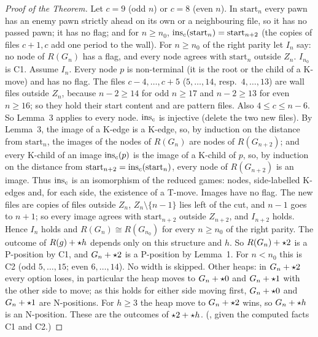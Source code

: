 \begin{wallproof}
\begin{proof}[Proof of the Theorem]
Let $c=9$ (odd $n$) or $c=8$ (even $n$). In $\mathrm{start}_n$ every pawn has an enemy pawn strictly ahead on its own or a neighbouring
file, so it has no passed pawn; it has no flag; and for $n\ge n_0$, $\operatorname{ins}_c(\mathrm{start}_n)=\mathrm{start}_{n+2}$ (the copies of files
$c+1,c$ add one period to the wall). For $n\ge n_0$ of the right parity let $I_n$ say: no node of $R(G_n)$ has a flag, and every node agrees with
$\mathrm{start}_n$ outside $Z_n$. $I_{n_0}$ is C1.
Assume $I_n$. Every node $p$ is non-terminal (it is the root or the child of a K-move) and has no flag. The files $c-4,\dots,c+5$
($5,\dots,14$, resp.\ $4,\dots,13$) are wall files outside $Z_n$, because $n-2\ge14$ for odd $n\ge17$ and $n-2\ge13$ for even
$n\ge16$; so they hold their start content and are pattern files. Also $4\le c\le n-6$. So Lemma~3 applies to every node.
$\operatorname{ins}_c$ is injective (delete the two new files). By Lemma~3, the image of a K-edge is a K-edge, so, by induction on the distance from
$\mathrm{start}_n$, the images of the nodes of $R(G_n)$ are nodes of $R(G_{n+2})$; and every K-child of an image $\operatorname{ins}_c(p)$ is the image of a K-child of $p$, so, by induction on the distance
from $\mathrm{start}_{n+2}=\operatorname{ins}_c(\mathrm{start}_n)$, every node of $R(G_{n+2})$ is an image. Thus $\operatorname{ins}_c$ is an isomorphism of the
reduced games: nodes, side-labelled K-edges and, for each side, the existence of a T-move. Images have no flag. The new files are copies of files outside $Z_n$, $Z_n\setminus\{n-1\}$ lies left of the cut, and $n-1$ goes to
$n+1$; so every image agrees with $\mathrm{start}_{n+2}$ outside $Z_{n+2}$, and $I_{n+2}$ holds.
Hence $I_n$ holds and $R(G_n)\cong R(G_{n_0})$ for every $n\ge n_0$ of the right parity. The outcome of $R(g)+\mathord{\star h}$ depends only on
this structure and $h$. So $R(G_n)+\mathord{\star2}$ is a P-position by C1, and
$G_n+\mathord{\star2}$ is a P-position by Lemma~1. For $n<n_0$ this is C2 (odd $5,\dots,15$; even $6,\dots,14$). No width is skipped.
Other heaps: in $G_n+\mathord{\star2}$ every option loses, in particular the heap moves to $G_n+\mathord{\star0}$ and $G_n+\mathord{\star1}$ with the other side to
move; as this holds for either side moving first, $G_n+\mathord{\star0}$ and $G_n+\mathord{\star1}$ are N-positions. For $h\ge3$ the heap move to $G_n+\mathord{\star2}$
wins, so $G_n+\mathord{\star h}$ is an N-position. These are the outcomes of $\mathord{\star2}+\mathord{\star h}$.
(, given the computed facts C1 and C2.)
\end{proof}


\end{wallproof}
